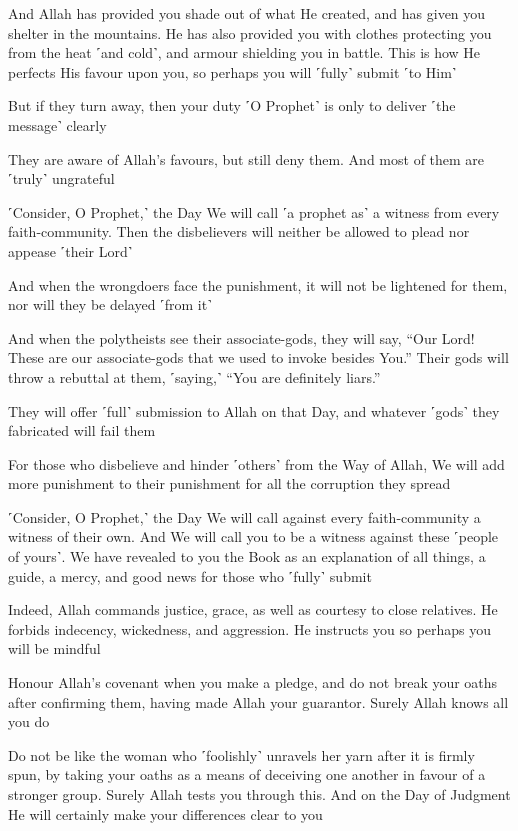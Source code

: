 And Allah has provided you shade out of what He created, and has given you shelter in the mountains. He has also provided you with clothes protecting you from the heat ˹and cold˺, and armour shielding you in battle. This is how He perfects His favour upon you, so perhaps you will ˹fully˺ submit ˹to Him˺

But if they turn away, then your duty ˹O Prophet˺ is only to deliver ˹the message˺ clearly

They are aware of Allah’s favours, but still deny them. And most of them are ˹truly˺ ungrateful

˹Consider, O Prophet,˺ the Day We will call ˹a prophet as˺ a witness from every faith-community. Then the disbelievers will neither be allowed to plead nor appease ˹their Lord˺

And when the wrongdoers face the punishment, it will not be lightened for them, nor will they be delayed ˹from it˺

And when the polytheists see their associate-gods, they will say, “Our Lord! These are our associate-gods that we used to invoke besides You.” Their gods will throw a rebuttal at them, ˹saying,˺ “You are definitely liars.”

They will offer ˹full˺ submission to Allah on that Day, and whatever ˹gods˺ they fabricated will fail them

For those who disbelieve and hinder ˹others˺ from the Way of Allah, We will add more punishment to their punishment for all the corruption they spread

˹Consider, O Prophet,˺ the Day We will call against every faith-community a witness of their own. And We will call you to be a witness against these ˹people of yours˺. We have revealed to you the Book as an explanation of all things, a guide, a mercy, and good news for those who ˹fully˺ submit

Indeed, Allah commands justice, grace, as well as courtesy to close relatives. He forbids indecency, wickedness, and aggression. He instructs you so perhaps you will be mindful

Honour Allah’s covenant when you make a pledge, and do not break your oaths after confirming them, having made Allah your guarantor. Surely Allah knows all you do

Do not be like the woman who ˹foolishly˺ unravels her yarn after it is firmly spun, by taking your oaths as a means of deceiving one another in favour of a stronger group. Surely Allah tests you through this. And on the Day of Judgment He will certainly make your differences clear to you

